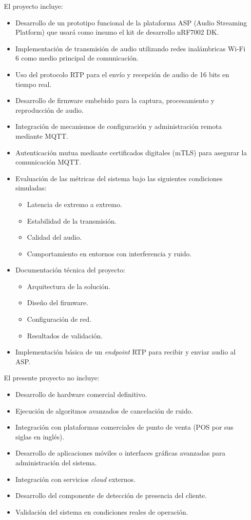\documentclass[
11pt, %
]{charter}
\begin{document}
El proyecto incluye:
\begin{itemize}
	\item Desarrollo de un prototipo funcional de la plataforma ASP (Audio Streaming Platform) que usará como insumo el kit de desarrollo nRF7002 DK.
	\item Implementación de transmisión de audio utilizando redes inalámbricas Wi-Fi 6 como medio principal de comunicación.
	\item Uso del protocolo RTP para el envío y recepción de audio de 16 bits en tiempo real.
	\item Desarrollo de firmware embebido para la captura, procesamiento y reproducción de audio.
	\item Integración de mecanismos de configuración y administración remota mediante MQTT.
	\item Autenticación mutua mediante certificados digitales (mTLS) para asegurar la comunicación MQTT.
	\item Evaluación de las métricas del sistema bajo las siguientes condiciones simuladas:
		\begin{itemize}
			\item Latencia de extremo a extremo.
			\item Estabilidad de la transmisión.
			\item Calidad del audio.
			\item Comportamiento en entornos con interferencia y ruido.
		\end{itemize}
	\item Documentación técnica del proyecto:
		\begin{itemize}
			\item Arquitectura de la solución.
			\item Diseño del firmware.
			\item Configuración de red.
			\item Resultados de validación.
		\end{itemize}
	\item Implementación básica de un \textit{endpoint}  RTP para recibir y enviar audio al ASP.
\end{itemize}
El presente proyecto no incluye:
\begin{itemize}
	\item Desarrollo de hardware comercial definitivo.
	\item Ejecución de algoritmos avanzados de cancelación de ruido.
	\item Integración con plataformas comerciales de punto de venta (POS por sus siglas en inglés).
	\item Desarrollo de aplicaciones móviles o interfaces gráficas avanzadas para administración del sistema.
	\item Integración con servicios \textit{cloud} externos.
	\item Desarrollo del componente de detección de presencia del cliente.
	\item Validación del sistema en condiciones reales de operación.
	
\end{itemize}
\end{document}
